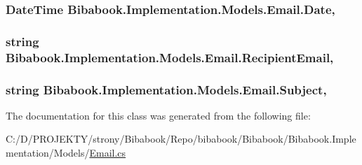 \subsubsection[{Date}]{\setlength{\rightskip}{0pt plus 5cm}Date\+Time Bibabook.\+Implementation.\+Models.\+Email.\+Date\hspace{0.3cm}{\ttfamily [get]}, {\ttfamily [set]}}\label{class_bibabook_1_1_implementation_1_1_models_1_1_email_a84d1820e0a0ae9fce66e15df4546cf46}
\hypertarget{class_bibabook_1_1_implementation_1_1_models_1_1_email_a1a8b55a0fa33dd44b9496e379858263d}{}
\subsubsection[{Recipient\+Email}]{\setlength{\rightskip}{0pt plus 5cm}string Bibabook.\+Implementation.\+Models.\+Email.\+Recipient\+Email\hspace{0.3cm}{\ttfamily [get]}, {\ttfamily [set]}}\label{class_bibabook_1_1_implementation_1_1_models_1_1_email_a1a8b55a0fa33dd44b9496e379858263d}
\hypertarget{class_bibabook_1_1_implementation_1_1_models_1_1_email_addc43ff83003a1972d568fdac29f89bd}{}
\subsubsection[{Subject}]{\setlength{\rightskip}{0pt plus 5cm}string Bibabook.\+Implementation.\+Models.\+Email.\+Subject\hspace{0.3cm}{\ttfamily [get]}, {\ttfamily [set]}}\label{class_bibabook_1_1_implementation_1_1_models_1_1_email_addc43ff83003a1972d568fdac29f89bd}


The documentation for this class was generated from the following file\+:\begin{DoxyCompactItemize}
\item 
C\+:/\+D/\+P\+R\+O\+J\+E\+K\+T\+Y/strony/\+Bibabook/\+Repo/bibabook/\+Bibabook/\+Bibabook.\+Implementation/\+Models/\hyperlink{_email_8cs}{Email.\+cs}\end{DoxyCompactItemize}
